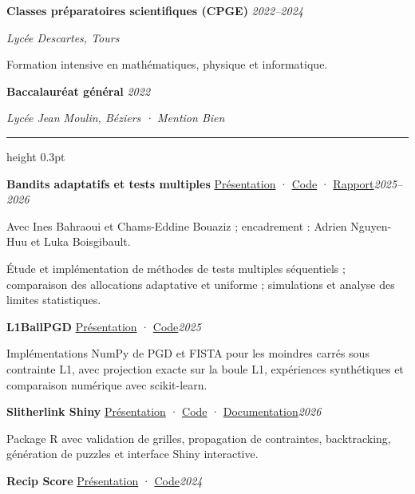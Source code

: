 \documentclass[a4paper,11pt]{article}
\newcommand{\cvsection}[1]{\par\vspace{7pt}{\fontsize{12}{14}\selectfont\scshape #1}\par\vspace{2pt}\hrule height 0.3pt\vspace{4pt}}
\newcommand{\cventry}[3]{\par\vspace{3pt}\textbf{#1} #3\hfill{\fontsize{9.8}{11.5}\selectfont\textit{#2}}\par}
\newenvironment{cvitems}{\begin{list}{\textbullet}{\setlength{\leftmargin}{1.1em}\setlength{\labelsep}{0.35em}\setlength{\itemsep}{1pt}\setlength{\topsep}{1pt}\setlength{\parsep}{0pt}\setlength{\partopsep}{0pt}}}{\end{list}}
\begin{document}
\cventry{Classes préparatoires scientifiques (CPGE)}{2022--2024}{}
\textit{Lycée Descartes, Tours}\\[1pt]
\begin{cvitems}
\item Formation intensive en mathématiques, physique et informatique.
\end{cvitems}
\cventry{Baccalauréat général}{2022}{}
\textit{Lycée Jean Moulin, Béziers · Mention Bien}\\[1pt]
\cvsection{Projets sélectionnés}
\cventry{Bandits adaptatifs et tests multiples}{2025--2026}{{\fontsize{9}{10.5}\selectfont\enspace \href{https://marouanedaoudi.github.io/fr/projets/bandit-simulation/}{Présentation} · \href{https://github.com/Chams22/bandit_approach_simulation}{Code} · \href{https://marouanedaoudi.github.io/uploads/bandit.pdf}{Rapport}}}
{\fontsize{9.7}{11.5}\selectfont Avec Ines Bahraoui et Chams-Eddine Bouaziz ; encadrement : Adrien Nguyen-Huu et Luka Boisgibault.}\par
\begin{cvitems}
\item Étude et implémentation de méthodes de tests multiples séquentiels ; comparaison des allocations adaptative et uniforme ; simulations et analyse des limites statistiques.
\end{cvitems}
\cventry{L1BallPGD}{2025}{{\fontsize{9}{10.5}\selectfont\enspace \href{https://marouanedaoudi.github.io/fr/projets/pgd/}{Présentation} · \href{https://github.com/marouanedaoudi/L1BallPGD}{Code}}}
\begin{cvitems}
\item Implémentations NumPy de PGD et FISTA pour les moindres carrés sous contrainte L1, avec projection exacte sur la boule L1, expériences synthétiques et comparaison numérique avec scikit-learn.
\end{cvitems}
\cventry{Slitherlink Shiny}{2026}{{\fontsize{9}{10.5}\selectfont\enspace \href{https://marouanedaoudi.github.io/fr/projets/slitherlink-shiny/}{Présentation} · \href{https://github.com/marouanedaoudi/slitherlink-shiny}{Code} · \href{https://marouanedaoudi.github.io/slitherlink-shiny/}{Documentation}}}
\begin{cvitems}
\item Package R avec validation de grilles, propagation de contraintes, backtracking, génération de puzzles et interface Shiny interactive.
\end{cvitems}
\cventry{Recip Score}{2024}{{\fontsize{9}{10.5}\selectfont\enspace \href{https://marouanedaoudi.github.io/fr/projets/recipscore/}{Présentation} · \href{https://github.com/akram3409/recip_score}{Code}}}
\end{document}
